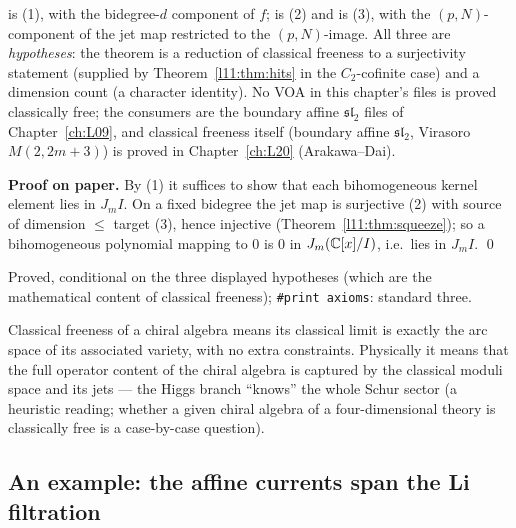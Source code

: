 \begin{dictionary}
 is (1), with  the
bidegree-$d$ component of $f$;  is (2) and  is (3), with  the
$(p,N)$-component of the jet map restricted to the $(p,N)$-image. All three are \emph{hypotheses}: the theorem is
a reduction of classical freeness to a surjectivity statement (supplied by Theorem~\ref{l11:thm:hits} in the
$C_2$-cofinite case) and a dimension count (a character identity). No VOA in this chapter's files is proved
classically free; the consumers are the boundary affine $\mathfrak{sl}_2$ files of Chapter~\ref{ch:L09}, and classical
freeness itself (boundary affine $\mathfrak{sl}_2$, Virasoro $M(2,2m+3)$) is proved in Chapter~\ref{ch:L20} (Arakawa--Dai).
\end{dictionary}

\textbf{Proof on paper.} By (1) it suffices to show that each bihomogeneous kernel element lies in $J_mI$. On a
fixed bidegree the jet map is surjective (2) with source of dimension $\le$ target (3), hence injective
(Theorem~\ref{l11:thm:squeeze}); so a bihomogeneous polynomial mapping to $0$ is $0$ in $J_m({\mathbb{C}}[x]/I)$, i.e.\ lies in
$J_mI$. \qed

\begin{status}
Proved, conditional on the three displayed hypotheses (which are the mathematical content of classical freeness);
\texttt{\#print axioms}: standard three.
\end{status}

\begin{physics}
Classical freeness of a chiral algebra means its classical limit is exactly the arc space of its associated
variety, with no extra constraints. Physically it means that the full operator content of the chiral algebra is
captured by the classical moduli space and its jets --- the Higgs branch ``knows'' the whole Schur sector (a heuristic reading; whether a given chiral algebra of a
four-dimensional theory is classically free is a case-by-case question).
\end{physics}

\subsection{An example: the affine currents span the Li filtration}

